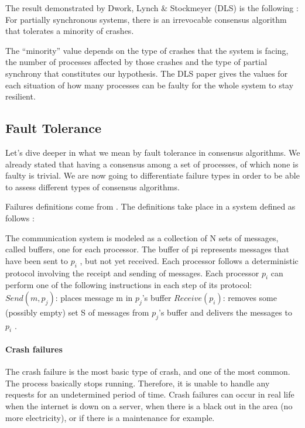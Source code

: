 \documentclass[11pt, twocolumn]{article}
\begin{document}
The result demonstrated by Dwork, Lynch \& Stockmeyer (DLS) is the following :
For partially synchronous systems, there is an irrevocable consensus algorithm that tolerates a minority of crashes.

The “minority” value depends on the type of crashes that the system is facing, the number of processes affected by those crashes and the type of partial synchrony that constitutes our hypothesis. The DLS paper gives the values for each situation of how many processes can be faulty for the whole system to stay resilient.

\subsection{Fault Tolerance}

Let’s dive deeper in what we mean by fault tolerance in consensus algorithms.
We already stated that having a consensus among a set of processes, of which none is faulty is trivial. We are now going to differentiate failure types in order to be able to assess different types of consensus algorithms.

Failures definitions come from \cite{partialSynchrony}. The definitions take place in a system defined as follows :
\begin{displayquote}
    The communication system is modeled as a collection of N sets of messages, called buffers, one for each processor. The buffer of pi represents messages that have been sent to $p_i$ , but not yet received. Each processor follows a deterministic protocol involving the receipt and sending of messages. Each processor $p_i$ can perform one of the following instructions in each step of its protocol:
    \(Send(m, p_j)\): places message m in $p_j$'s buffer
    \(Receive(p_i)\): removes some (possibly empty) set S of messages from $p_j$'s buffer and delivers the messages to $p_i$ .
\end{displayquote}

\paragraph{Crash failures}

The crash failure is the most basic type of crash, and one of the most common. The process basically stops running. Therefore, it is unable to handle any requests for an undetermined period of time. Crash failures can occur in real life when the internet is down on a server, when there is a black out in the area (no more electricity), or if there is a maintenance for example.
\end{document}
